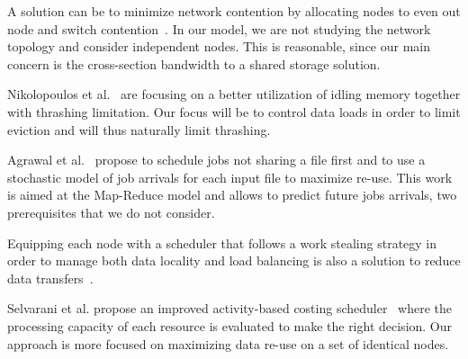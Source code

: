 \documentclass[conference,10pt]{IEEEtran}
\begin{document}
A solution can be to minimize network contention by allocating nodes to even out node and
switch contention~\cite{minimize_network_contention}. 
In our model, we are not studying the network topology and consider independent nodes.
This is reasonable, since our main concern is the cross-section bandwidth to a shared storage solution.

Nikolopoulos et al.~\cite{Nikolopoulos2003AdaptiveSU}
are focusing on a better utilization of idling memory together with 
thrashing limitation.
Our focus will be to control data loads in order to limit eviction
and will thus naturally limit thrashing.

Agrawal et al.~\cite{Scheduling_Shared_Scans_of_Large_Data_Files}
propose to schedule jobs not sharing a file first
and to use a stochastic model of job arrivals for each input file to maximize re-use.
This work is aimed at the Map-Reduce model and allows to predict future jobs arrivals, two prerequisites that we do not consider.

Equipping each node with a scheduler that follows a work
stealing strategy in order to manage both data locality 
and load balancing is also a solution to reduce data transfers~\cite{Optimizing_load_balancing_and_data_locality_with_data_aware_scheduling}.

Selvarani et al. propose an improved activity-based costing scheduler~\cite{Improved_cost_based_algorithm}
where the processing capacity of each resource is evaluated to make the right decision.
Our approach is more focused on maximizing data re-use on a 
set of identical nodes.
\end{document}
